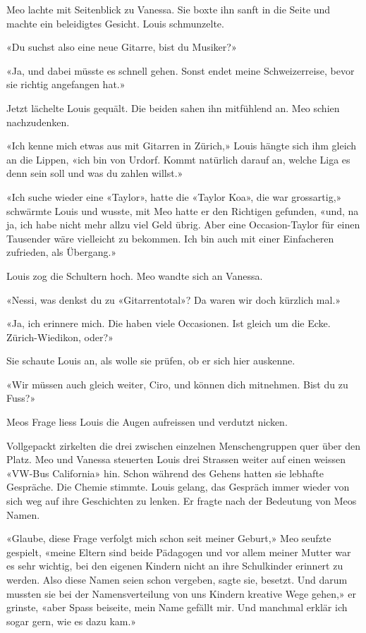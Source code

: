 Meo lachte mit Seitenblick zu Vanessa. Sie boxte ihn sanft in die Seite und machte ein beleidigtes Gesicht. 
Louis schmunzelte.

«Du suchst also eine neue Gitarre, bist du Musiker?»

«Ja, und dabei müsste es schnell gehen. Sonst endet meine
Schweizerreise, bevor sie richtig angefangen hat.»

Jetzt lächelte Louis gequält.
Die beiden sahen ihn mitfühlend an. Meo schien nachzudenken.

«Ich kenne mich etwas aus mit Gitarren in Zürich,» Louis hängte sich ihm
gleich an die Lippen, «ich bin von Urdorf. Kommt natürlich darauf an,
welche Liga es denn sein soll und was du zahlen willst.»

«Ich suche wieder eine «Taylor», hatte die «Taylor Koa», die war
grossartig,» schwärmte Louis und wusste, mit Meo hatte er den Richtigen gefunden,
«und, na ja, ich habe nicht mehr allzu viel Geld übrig. Aber eine
Occasion-Taylor für einen Tausender wäre vielleicht zu bekommen. Ich bin
auch mit einer Einfacheren zufrieden, als Übergang.»

Louis zog die Schultern hoch. Meo wandte sich an Vanessa.

«Nessi, was denkst du zu «Gitarrentotal»? Da waren wir doch kürzlich
mal.»

«Ja, ich erinnere mich. Die haben viele Occasionen. Ist gleich um die
Ecke. Zürich-Wiedikon, oder?»

Sie schaute Louis an, als wolle sie prüfen, ob er sich hier auskenne.

«Wir müssen auch gleich weiter, Ciro, und können dich mitnehmen. Bist du
zu Fuss?» 

Meos Frage liess Louis die Augen aufreissen und verdutzt nicken.

Vollgepackt zirkelten die drei zwischen einzelnen Menschengruppen quer über den
Platz. Meo und Vanessa steuerten Louis drei Strassen weiter auf einen
weissen «VW-Bus California» hin.
Schon während des Gehens hatten sie lebhafte Gespräche. Die Chemie
stimmte.
Louis gelang, das Gespräch immer wieder von sich weg auf ihre
Geschichten zu lenken. Er fragte nach der Bedeutung von Meos Namen.

«Glaube, diese Frage verfolgt mich schon seit meiner Geburt,» Meo
seufzte gespielt, «meine Eltern sind beide Pädagogen und vor allem
meiner Mutter war es sehr wichtig, bei den eigenen Kindern nicht an ihre
Schulkinder erinnert zu werden. Also diese Namen seien schon vergeben,
sagte sie, besetzt. Und darum mussten sie bei der Namensverteilung von
uns Kindern kreative Wege gehen,» er grinste, «aber Spass beiseite, mein Name
gefällt mir. Und manchmal erklär ich sogar gern, wie es dazu kam.»

